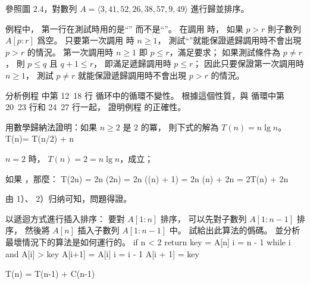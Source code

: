 \startsection[
  title={Designing algorithms},
]

\startEXERCISE
參照圖 2.4，對數列 $A=\langle 3,41,52,26,38,57,9,49\rangle$ 進行歸並排序。
\stopEXERCISE
\startANSWER
\externalfigure[output/e2_3_1-1]
\stopANSWER

\startEXERCISE
{} 例程中，
第一行在測試時用的是“” 而不是“”。
在調用  時，
如果 $p>r$ 則子數列 $A[p:r]$ 爲空。
只要第一次調用  時 $n\ge 1$，
測試“”就能保證遞歸調用時不會出現 $p>r$ 的情況。
\stopEXERCISE
\startANSWER
第一次調用時 $n\ge 1$ 即 $p\le r$，滿足要求；
如果測試條件為 $p\ne r$，
則 $p\le q$ 且 $q+1\le r$，
即滿足遞歸調用時 $p\le r$；
因此只要保證第一次調用時 $n\ge 1$，
測試 $p\ne r$ 就能保證遞歸調用時不會出現 $p>r$ 的情況。
\stopANSWER

\startEXERCISE
分析例程  中第 12~18 行  循环中的循環不變性。
根據這個性質，與  循環中第 20~23 行和 24~27 行一起，
證明例程  的正確性。
\stopEXERCISE
\startANSWER
{}
\stopANSWER

\startEXERCISE
用數學歸納法證明：如果 $n\ge 2$ 是 $2$ 的冪，
則下式的解為 $T(n)=n\lg n$。
\startformula
T(n)=\startmathcases
{} \NC {}\NR
{} T(n/2) + n \NC {} \NR
\stopmathcases
\stopformula
\stopEXERCISE

\startANSWER
\startigBase[n]
\item $n=2$ 時， $T(n)=2=n\lg n$，成立；
\item 如果 ，那麼：
\startsplitformula\startmathalignment
\NC T(2n) \NC = 2n \lg(2n) \NR
\NC       \NC = 2n (\lg(n) + 1) \NR
\NC	      \NC = 2n \lg(n) + 2n \NR
\NC	      \NC = 2T(n) + 2n \NR
\stopmathalignment\stopsplitformula
\item 由 1）、 2）归纳可知，問題得證。
\stopigBase
\stopANSWER

\startEXERCISE
以遞迴方式進行插入排序：
要對 $A[1:n]$ 排序，
可以先對子數列 $A[1:n-1]$ 排序，
然後將 $A[n]$ 插入子數列 $A[1:n-1]$ 中。
試給出此算法的僞碼。
並分析最壞情況下的算法是如何運行的。
\stopEXERCISE
\startANSWER
{}
\startCLRSCODE
if n < 2
	return
key = A[n]
i = n - 1
while i  and A[i] > key
	A[i+1] = A[i]
	i = i - 1
A[i + 1] = key
\stopCLRSCODE

\startformula
T(n) = \startmathcases
{} \NC {} \NR
\NC T(n-1) + C(n-1)	\NC {} \NR
\stopmathcases
\stopformula

